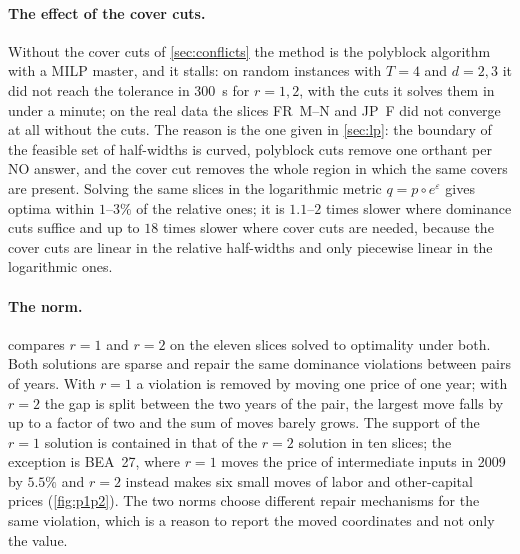 \paragraph{The effect of the cover cuts.} Without the cover cuts of \cref{sec:conflicts} the method is the polyblock algorithm with a MILP master, and it stalls: on random instances with $T=4$ and $d=2,3$ it did not reach the tolerance in 300~s for $r=1,2$, with the cuts it solves them in under a minute; on the real data the slices FR~M--N and JP~F did not converge at all without the cuts. The reason is the one given in \cref{sec:lp}: the boundary of the feasible set of half-widths is curved, polyblock cuts remove one orthant per NO answer, and the cover cut removes the whole region in which the same covers are present. Solving the same slices in the logarithmic metric $q=p\circ e^{\varepsilon}$ gives optima within $1$--$3\%$ of the relative ones; it is $1.1$--$2$ times slower where dominance cuts suffice and up to $18$ times slower where cover cuts are needed, because the cover cuts are linear in the relative half-widths and only piecewise linear in the logarithmic ones.

\paragraph{The norm.}  compares $r=1$ and $r=2$ on the eleven slices solved to optimality under both. Both solutions are sparse and repair the same dominance violations between pairs of years. With $r=1$ a violation is removed by moving one price of one year; with $r=2$ the gap is split between the two years of the pair, the largest move falls by up to a factor of two and the sum of moves barely grows. The support of the $r=1$ solution is contained in that of the $r=2$ solution in ten slices; the exception is BEA~27, where $r=1$ moves the price of intermediate inputs in 2009 by $5.5\%$ and $r=2$ instead makes six small moves of labor and other-capital prices (\cref{fig:p1p2}). The two norms choose different repair mechanisms for the same violation, which is a reason to report the moved coordinates and not only the value.

